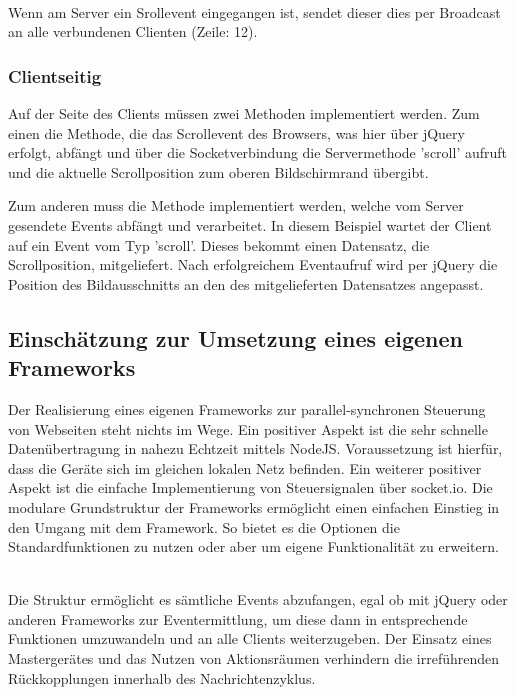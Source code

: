 	\\Wenn am Server ein Srollevent eingegangen ist, sendet dieser dies per Broadcast an alle verbundenen Clienten (Zeile: 12).
	
	\subsubsection{Clientseitig}
	Auf der Seite des Clients müssen zwei Methoden implementiert werden. Zum einen die Methode, die das Scrollevent des Browsers, was hier über jQuery erfolgt, abfängt und über die Socketverbindung die Servermethode 'scroll' aufruft und die aktuelle Scrollposition zum oberen Bildschirmrand übergibt.
	
	
	Zum anderen muss die Methode implementiert werden, welche vom Server gesendete \Gls{Event}s abfängt und verarbeitet. In diesem Beispiel wartet der Client auf ein \Gls{Event} vom Typ 'scroll'. Dieses bekommt einen Datensatz, die Scrollposition, mitgeliefert. Nach erfolgreichem \Gls{Event}aufruf wird per jQuery die Position des Bildausschnitts an den des mitgelieferten Datensatzes angepasst.
	

	\subsection{Einschätzung zur Umsetzung eines eigenen \Gls{Framework}s}
	Der Realisierung eines eigenen \Gls{Framework}s zur \gls{parallel-synchron}en Steuerung von Webseiten steht nichts im Wege. Ein positiver Aspekt ist die sehr schnelle Datenübertragung in nahezu Echtzeit mittels \gls{NodeJS}. Voraussetzung ist hierfür, dass die Geräte sich im gleichen lokalen Netz befinden. Ein weiterer positiver Aspekt ist die einfache Implementierung von Steuersignalen über socket.io. Die modulare Grundstruktur der \Gls{Framework}s ermöglicht einen einfachen Einstieg in den Umgang mit dem \Gls{Framework}. So bietet es die Optionen die Standardfunktionen zu nutzen oder aber um eigene Funktionalität zu erweitern.

\\Die Struktur ermöglicht es sämtliche \Gls{Event}s abzufangen, egal ob mit jQuery oder anderen \Gls{Framework}s zur \Gls{Event}ermittlung, um diese dann in entsprechende Funktionen umzuwandeln und an alle Clients weiterzugeben. Der Einsatz eines Mastergerätes und das Nutzen von Aktionsräumen verhindern die irreführenden Rückkopplungen innerhalb des Nachrichtenzyklus. 

